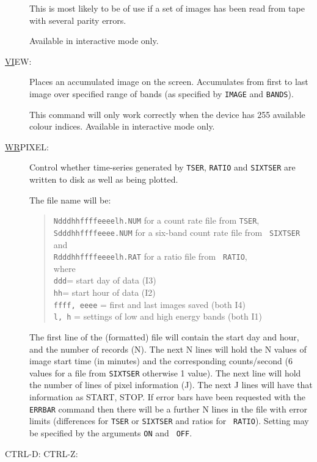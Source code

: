 \begin{description}
This is most likely to be of use if a set of images has been read from
tape with several parity errors.

Available in interactive mode only.

\item[\underline{VI}EW: ] \label{vi}
Places an accumulated image on the screen.  Accumulates from first to
last image over specified range of bands (as specified by {\tt IMAGE}
and {\tt BANDS}).

This command will only work correctly when the device has 255 available
colour indices.  Available in interactive mode only.

\item[\underline{WR}PIXEL: ]  \label{wr}
Control whether time-series generated by {\tt TSER}, {\tt RATIO} and
{\tt SIXTSER} are written to disk as well as being plotted.

The file name will be:
\begin{quote} 
{\tt Ndddhhffffeeeelh.NUM} for a count rate file from {\tt TSER},\\
{\tt Sdddhhffffeeee.NUM} for a six-band count rate file from {\tt
SIXTSER} and \\ {\tt Rdddhhffffeeeelh.RAT} for a ratio file from {\tt
RATIO},\\ where\\ {\tt ddd}= start day of data (I3)\\ {\tt hh}= start
hour of data (I2)\\ {\tt ffff, eeee} = first and last images saved
(both I4)\\ {\tt l, h} = settings of low and high energy bands (both
I1)
\end{quote}

The first line of the (formatted) file will contain the start day and
hour, and the number of records (N).  The next N lines will hold the N
values of image start time (in minutes) and the corresponding
counts/second (6 values for a file from {\tt SIXTSER} otherwise 1
value).  The next line will hold the number of lines of pixel
information (J).  The next J lines will have that information as START,
STOP.  If error bars have been requested with the {\tt ERRBAR} command
then there will be a further N lines in the file with error limits
(differences for {\tt TSER} or {\tt SIXTSER} and ratios for {\tt
RATIO}).  Setting may be specified by the arguments {\tt ON} and {\tt
OFF}.


\item[CTRL-D: CTRL-Z:] \label{eof}


\end{description}
